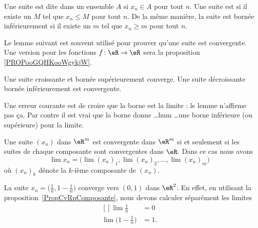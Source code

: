 Une suite est dite  dans un ensemble \( A\) si \( x_n\in A\) pour tout \( n\). Une suite est  si il existe un \( M\) tel que \( x_n\leq M\) pour tout \( n\). De la même manière, la suite est bornée inférieurement si il existe un \( m\) tel que \( x_n\geq m\) pour tout \( n\).

Le lemme suivant est souvent utilisé pour prouver qu'une suite est convergente. Une version pour les fonctions \( f\colon \eR\to \eR\) sera la proposition \ref{PROPooGQHKooWgykjW}.
\begin{lemma}       \label{LemSuiteCrBorncv}
	Une suite croissante et bornée supérieurement converge. Une suite décroissante bornée inférieurement est convergente.
\end{lemma}

Une erreur courante est de croire que la borne est la limite : le lemme n'affirme pas ça. Par contre il est vrai que la borne donne \ldots hum \ldots une borne inférieure (ou supérieure) pour la limite.

\begin{proposition}     \label{PropCvRpComposante}
	Une suite \( (x_n)\) dans \( \eR^m\) est convergente dans \( \eR^m\) si et seulement si les suites de chaque composante sont convergentes dans \( \eR\). Dans ce cas nous avons
	\begin{equation}
		\lim x_n=\Big( \lim(x_n)_1,\lim (x_n)_2,\ldots,\lim (x_n)_m \Big)
	\end{equation}
	où \( (x_n)_k\) dénote la \( k\)-ième composante de \( (x_n)\).
\end{proposition}

\begin{example}
	La suite \( x_n=\big( \frac{1}{ n },1-\frac{1}{ n } \big)\) converge vers \( (0,1)\) dans \( \eR^2\). En effet, en utilisant la proposition~\ref{PropCvRpComposante}, nous devons calculer séparément les limites
	\begin{equation}
		\begin{aligned}[]
			\lim\frac{1}{ n }               & =0  \\
			\lim\big( 1-\frac{1}{ n } \big) & =1.
		\end{aligned}
	\end{equation}
\end{example}

